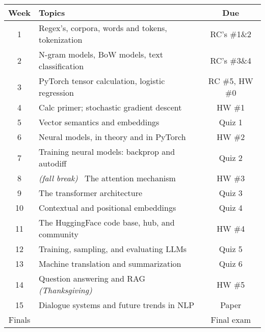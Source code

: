 \documentclass[12pt]{article}
\begin{document}
\addtolength{\hoffset}{-.4in}
\begin{center}
\begin{tabular}{|c|l|c|}
\hline
Week & Topics & Due \\

\hline
1  & Regex's, corpora, words and tokens, tokenization & RC's \#1\&2 \\
2  & N-gram models, BoW models, text classification   & RC's \#3\&4 \\
3  & PyTorch tensor calculation, logistic regression  & RC \#5, HW \#0 \\
4  & Calc primer; stochastic gradient descent         & HW \#1 \\
5  & Vector semantics and embeddings                  & Quiz 1\\
6  & Neural models, in theory and in PyTorch          & HW \#2 \\
7  & Training neural models: backprop and autodiff    & Quiz 2\\
8  & \textit{\color{gray} (fall break)} \ The attention mechanism & HW \#3 \\
9  & The transformer architecture                     & Quiz 3 \\
10 & Contextual and positional embeddings             & Quiz 4\\
11 & The HuggingFace code base, hub, and community    & HW \#4 \\
12 & Training, sampling, and evaluating LLMs          & Quiz 5 \\
13 & Machine translation and summarization            & Quiz 6 \\
14 & Question answering and RAG \ \textit{\color{gray} (Thanksgiving)} & HW \#5 \\
15 & Dialogue systems and future trends in NLP        & Paper \\
Finals &                                              & Final exam \\
\hline
\end{tabular}
\end{center}
\end{document}
